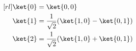 %
%

\begin{equation}
    \begin{aligned}[rl]
         \ket{0}&= \ket{0, 0}  \\
         \ket{1} &= \frac{1}{\sqrt{2}}(\ket{1, 0} -  \ket{0, 1}) \\
         \ket{2} &= \frac{1}{\sqrt{2}}(\ket{1, 0} + \ket{0, 1}) \\
     \end{aligned}
\label{eq:htwo_states}
\end{equation}

%